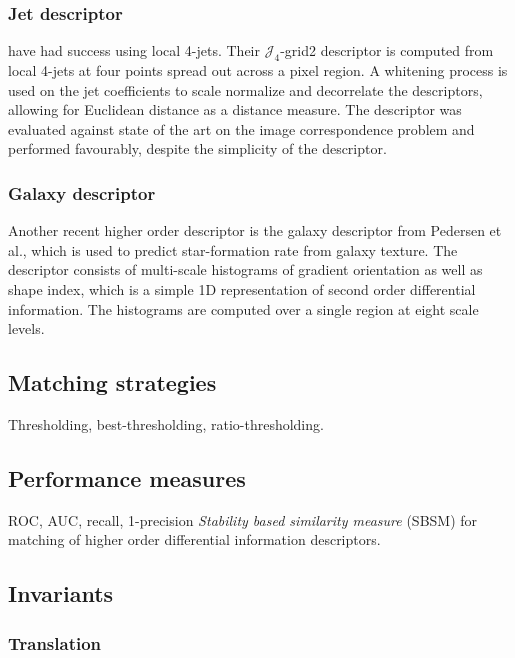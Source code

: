 \documentclass[../thesis.tex]{subfiles}
\begin{document}
\subsubsection{Jet descriptor}

\cite{larsen2012jet} have had success using local 4-jets. Their
$\mathcal{J}_4$-grid2 descriptor is computed from local 4-jets at four points
spread out across a pixel region. A whitening process is used on the jet
coefficients to scale normalize and decorrelate the descriptors, allowing for
Euclidean distance as a distance measure. The descriptor was evaluated against
state of the art on the image correspondence problem and performed favourably,
despite the simplicity of the descriptor.

\subsubsection{Galaxy descriptor}

Another recent higher order descriptor is the galaxy descriptor from Pedersen
et al.\cite{pedersen2013shape}, which is used to predict star-formation
rate from galaxy texture. The descriptor consists of multi-scale histograms
of gradient orientation as well as shape index, which is a simple 1D
representation of second order differential information. The histograms are
computed over a single region at eight scale levels.

\subsection{Matching strategies}
\label{sec:matching_strategies}

Thresholding, best-thresholding, ratio-thresholding.

\subsection{Performance measures}
\label{sec:performance_measures}

ROC, AUC, recall, 1-precision
\emph{Stability based similarity measure} (SBSM) \cite{balmashnova2008novel} for matching of higher order differential information descriptors.


\subsection{Invariants}

\subsubsection{Translation}
\end{document}
